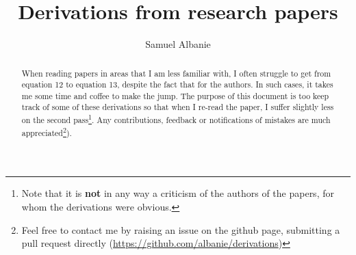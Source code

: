 \documentclass[11pt,openany]{memoir}
\title{Derivations from research papers}
\author{
Samuel Albanie
}
\date{}
\begin{document}


\frontmatter
\maketitle{}

\begin{abstract}
When reading papers in areas that I am less familiar with, I often struggle to get from equation 12 to equation 13, despite the fact that  for the authors. In such cases, it takes me some time and coffee to make the jump.  The purpose of this document is too keep track of some of these derivations so that when I re-read the paper, I suffer slightly less on the second pass\footnote{Note that it is \textbf{not} in any way a criticism of the authors of the papers, for whom the derivations were obvious.}. Any contributions, feedback or notifications of mistakes are much appreciated\footnote{Feel free to contact me by raising an issue on the github page, submitting a pull request directly (\mbox{\url{https://github.com/albanie/derivations})}}).
\end{abstract}
\clearpage

\tableofcontents*
\clearpage

\mainmatter






\end{document}
